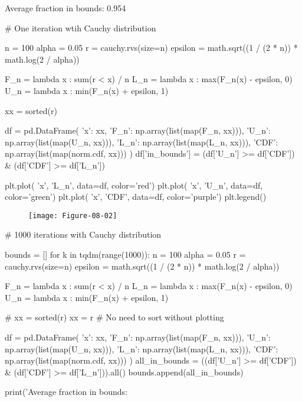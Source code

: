 \begin{console}
Average fraction in bounds: 0.954
\end{console}

\begin{python}
# One iteration wtih Cauchy distribution

n = 100
alpha = 0.05
r = cauchy.rvs(size=n)
epsilon = math.sqrt((1 / (2 * n)) * math.log(2 / alpha))

F_{n} = lambda x : sum(r < x) / n
L_{n} = lambda x : max(F_{n}(x) - epsilon, 0)
U_{n} = lambda x : min(F_{n}(x) + epsilon, 1)

xx = sorted(r)

df = pd.DataFrame({
    'x': xx, 
    'F_{n}': np.array(list(map(F_{n}, xx))), 
    'U_{n}': np.array(list(map(U_{n}, xx))), 
    'L_{n}': np.array(list(map(L_{n}, xx))), 
    'CDF': np.array(list(map(norm.cdf, xx)))
})
df['in_bounds'] = (df['U_{n}'] >= df['CDF']) & (df['CDF'] >= df['L_{n}'])

plt.plot( 'x', 'L_{n}', data=df, color='red')
plt.plot( 'x', 'U_{n}', data=df, color='green')
plt.plot( 'x', 'CDF', data=df, color='purple')
plt.legend()
\end{python}

\begin{figure}[H]
\centering
\texttt{[image: Figure-08-02]}
\end{figure}

\begin{python}
# 1000 iterations with Cauchy distribution

bounds = []
for k in tqdm(range(1000)):
    n = 100
    alpha = 0.05
    r = cauchy.rvs(size=n)
    epsilon = math.sqrt((1 / (2 * n)) * math.log(2 / alpha))

    F_{n} = lambda x : sum(r < x) / n
    L_{n} = lambda x : max(F_{n}(x) - epsilon, 0)
    U_{n} = lambda x : min(F_{n}(x) + epsilon, 1)

    # xx = sorted(r)
    xx = r # No need to sort without plotting

    df = pd.DataFrame({
        'x': xx, 
        'F_{n}': np.array(list(map(F_{n}, xx))), 
        'U_{n}': np.array(list(map(U_{n}, xx))), 
        'L_{n}': np.array(list(map(L_{n}, xx))), 
        'CDF': np.array(list(map(norm.cdf, xx)))
    })
    all_{i}n_bounds = ((df['U_{n}'] >= df['CDF']) & (df['CDF'] >= df['L_{n}'])).all()
    bounds.append(all_{i}n_bounds)
    
print('Average fraction in bounds: %
\end{python}

